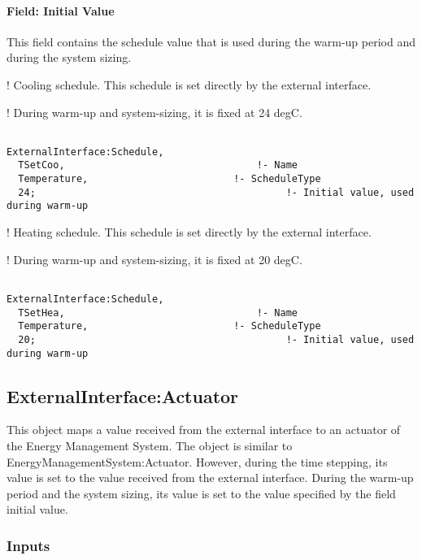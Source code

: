\paragraph{Field: Initial Value}\label{field-initial-value}

This field contains the schedule value that is used during the warm-up period and during the system sizing.

! Cooling schedule. This schedule is set directly by the external interface.

! During warm-up and system-sizing, it is fixed at 24 degC.

\begin{lstlisting}

ExternalInterface:Schedule,
  TSetCoo,                                 !- Name
  Temperature,                         !- ScheduleType
  24;                                           !- Initial value, used during warm-up
\end{lstlisting}

! Heating schedule. This schedule is set directly by the external interface.

! During warm-up and system-sizing, it is fixed at 20 degC.

\begin{lstlisting}

ExternalInterface:Schedule,
  TSetHea,                                 !- Name
  Temperature,                         !- ScheduleType
  20;                                           !- Initial value, used during warm-up
\end{lstlisting}

\subsection{ExternalInterface:Actuator}\label{externalinterfaceactuator}

This object maps a value received from the external interface to an actuator of the Energy Management System. The object is similar to EnergyManagementSystem:Actuator. However, during the time stepping, its value is set to the value received from the external interface. During the warm-up period and the system sizing, its value is set to the value specified by the field initial value.

\subsubsection{Inputs}\label{inputs-2-015}

